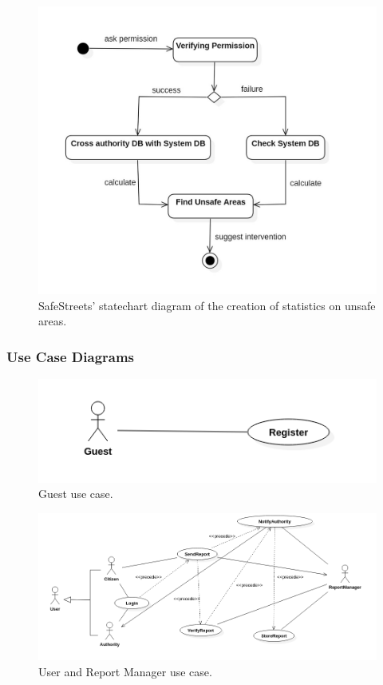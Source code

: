 \documentclass{report}
\begin{document}
\begin{figure}[h!]
\begin{center}
\includegraphics[scale=0.4]{./img/img_UnsafeAreas.jpg}
\end{center}
\caption{SafeStreets' statechart diagram of the creation of statistics on unsafe areas.}
\label{fig:unsafeareas}
\end{figure}
\newpage
\subsubsection{Use Case Diagrams}

\begin{figure}[ht!]
\begin{center}
\includegraphics[scale=0.4]{./img/UseCase1.png}
\end{center}
\caption{Guest use case.}
\label{fig:UseCase1}
\end{figure}

\begin{figure}[ht!]
\begin{center}
\includegraphics[scale=0.4]{./img/UseCase2.png}
\end{center}
\caption{User and Report Manager use case.}
\label{fig:UseCase2}
\end{figure}
\end{document}
